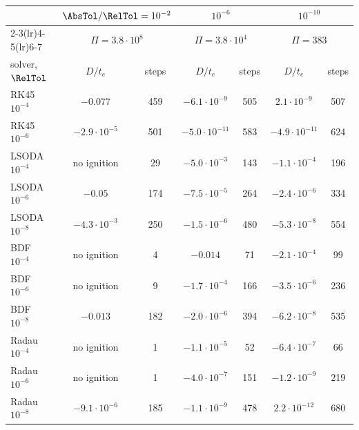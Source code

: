 \begin{tabular}{lcccccc}
\toprule
& \multicolumn{2}{c}{$\AbsTol/\RelTol=10^{-2}$} & \multicolumn{2}{c}{$10^{-6}$} & \multicolumn{2}{c}{$10^{-10}$}\\
\cmidrule(lr){2-3}\cmidrule(lr){4-5}\cmidrule(lr){6-7}
& \multicolumn{2}{c}{$\Pi=3.8\cdot10^{8}$} & \multicolumn{2}{c}{$\Pi=3.8\cdot10^{4}$} & \multicolumn{2}{c}{$\Pi=383$}\\
solver, $\RelTol$ & $D/t_e$ & steps & $D/t_e$ & steps & $D/t_e$ & steps\\
\midrule
RK45 $10^{-4}$ & $-0.077$ & 459 & $-6.1\cdot10^{-9}$ & 505 & $2.1\cdot10^{-9}$ & 507 \\
RK45 $10^{-6}$ & $-2.9\cdot10^{-5}$ & 501 & $-5.0\cdot10^{-11}$ & 583 & $-4.9\cdot10^{-11}$ & 624 \\
LSODA $10^{-4}$ & no ignition & 29 & $-5.0\cdot10^{-3}$ & 143 & $-1.1\cdot10^{-4}$ & 196 \\
LSODA $10^{-6}$ & $-0.05$ & 174 & $-7.5\cdot10^{-5}$ & 264 & $-2.4\cdot10^{-6}$ & 334 \\
LSODA $10^{-8}$ & $-4.3\cdot10^{-3}$ & 250 & $-1.5\cdot10^{-6}$ & 480 & $-5.3\cdot10^{-8}$ & 554 \\
BDF $10^{-4}$ & no ignition & 4 & $-0.014$ & 71 & $-2.1\cdot10^{-4}$ & 99 \\
BDF $10^{-6}$ & no ignition & 9 & $-1.7\cdot10^{-4}$ & 166 & $-3.5\cdot10^{-6}$ & 236 \\
BDF $10^{-8}$ & $-0.013$ & 182 & $-2.0\cdot10^{-6}$ & 394 & $-6.2\cdot10^{-8}$ & 535 \\
Radau $10^{-4}$ & no ignition & 1 & $-1.1\cdot10^{-5}$ & 52 & $-6.4\cdot10^{-7}$ & 66 \\
Radau $10^{-6}$ & no ignition & 1 & $-4.0\cdot10^{-7}$ & 151 & $-1.2\cdot10^{-9}$ & 219 \\
Radau $10^{-8}$ & $-9.1\cdot10^{-6}$ & 185 & $-1.1\cdot10^{-9}$ & 478 & $2.2\cdot10^{-12}$ & 680 \\
\bottomrule
\end{tabular}
